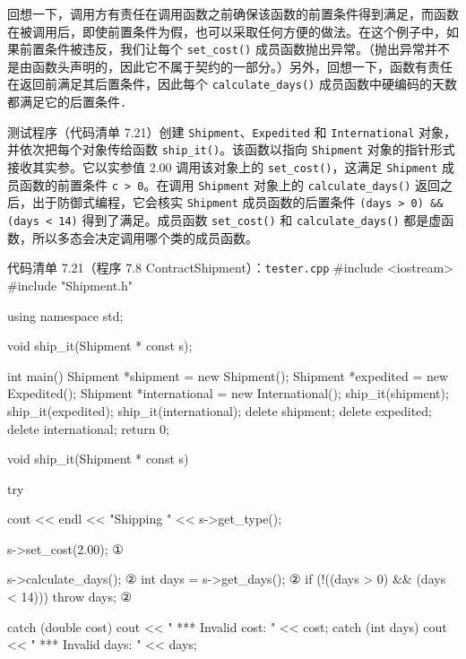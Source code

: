 回想一下，调用方有责任在调用函数之前确保该函数的前置条件得到满足，而函数在被调用后，即使前置条件为假，也可以采取任何方便的做法。在这个例子中，如果前置条件被违反，我们让每个 \texttt{set\_\allowbreak{}cost(\allowbreak{})\allowbreak{}} 成员函数抛出异常。（抛出异常并不是由函数头声明的，因此它不属于契约的一部分。）另外，回想一下，函数有责任在返回前满足其后置条件，因此每个 \texttt{calculate\_\allowbreak{}days(\allowbreak{})\allowbreak{}} 成员函数中硬编码的天数都满足它的后置条件\texttt{.}

测试程序（代码清单 7.21）创建 \texttt{Shipment}、\texttt{Expedited} 和 \texttt{International} 对象，并依次把每个对象传给函数 \texttt{ship\_\allowbreak{}it(\allowbreak{})\allowbreak{}}。该函数以指向 \texttt{Shipment} 对象的指针形式接收其实参。它以实参值 2.00 调用该对象上的 \texttt{set\_\allowbreak{}cost(\allowbreak{})\allowbreak{}}，这满足 \texttt{Shipment} 成员函数的前置条件 \texttt{c > 0}。在调用 \texttt{Shipment} 对象上的 \texttt{calculate\_\allowbreak{}days(\allowbreak{})\allowbreak{}} 返回之后，出于防御式编程，它会核实 \texttt{Shipment} 成员函数的后置条件 \texttt{(\allowbreak{}days > 0)\allowbreak{} \&\& (\allowbreak{}days < 14)\allowbreak{}} 得到了满足。成员函数 \texttt{set\_\allowbreak{}cost(\allowbreak{})\allowbreak{}} 和 \texttt{calculate\_\allowbreak{}days(\allowbreak{})\allowbreak{}} 都是虚函数，所以多态会决定调用哪个类的成员函数。

\begin{codeboxt}{代码清单 7.21（程序 7.8 ContractShipment）：\texttt{tester.\allowbreak{}cpp}}
#include <iostream>
#include "Shipment.h"

using namespace std;

void ship_it(Shipment * const s);

int main()
{
    Shipment *shipment      = new Shipment();
    Shipment *expedited     = new Expedited();
    Shipment *international = new International();
    ship_it(shipment);
    ship_it(expedited);
    ship_it(international);
    delete shipment;
    delete expedited;
    delete international;
    return 0;
}

void ship_it(Shipment * const s)
{
    try
    {
        cout << endl << "Shipping " << s->get_type();

        s->set_cost(2.00);                            ①

        s->calculate_days();                          ②
        int days = s->get_days();                     ②
        if (!((days > 0) && (days < 14))) throw days; ②
    }

    catch (double cost)
    {
        cout << " *** Invalid cost: " << cost;
    }
    catch (int days)
    {
        cout << " *** Invalid days: " << days;
    }
}
\end{codeboxt}
\par
{}\par

